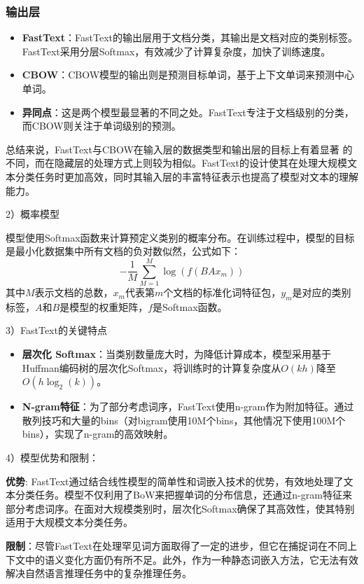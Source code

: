 \subsubsection*{输出层}
\begin{itemize}
    \item \textbf{FastText}：FastText的输出层用于文档分类，其输出是文档对应的类别标签。FastText采用分层Softmax，有效减少了计算复杂度，加快了训练速度。
    \item \textbf{CBOW}：CBOW模型的输出则是预测目标单词，基于上下文单词来预测中心单词。
    \item \textbf{异同点}：这是两个模型最显著的不同之处。FastText专注于文档级别的分类，而CBOW则关注于单词级别的预测。
\end{itemize}

总结来说，FastText与CBOW在输入层的数据类型和输出层的目标上有着显著
的不同，而在隐藏层的处理方式上则较为相似。FastText的设计使其在处理大规模文
本分类任务时更加高效，同时其输入层的丰富特征表示也提高了模型对文本的理解能力。


2）概率模型

模型使用Softmax函数来计算预定义类别的概率分布。在训练过程中，模型的目标是最小化数据集中所有文档的负对数似然，公式如下：
\begin{equation}
  - \frac{1}{M} \sum_{M=1}^{M} \log(f(BAx_m))
\end{equation}
其中$M$表示文档的总数，$x_m$代表第$m$个文档的标准化词特征包，$y_m$是对应的类别标签，$A$和$B$是模型的权重矩阵，$f$是Softmax函数。

3）FastText的关键特点

\begin{itemize}
  \item \textbf{层次化 Softmax}：当类别数量庞大时，为降低计算成本，模型采用基于Huffman编码树的层次化Softmax，将训练时的计算复杂度从$O(kh)$降至$O(h \log_2(k))$。
  \item \textbf{N-gram特征}：为了部分考虑词序，FastText使用n-gram作为附加特征。通过散列技巧和大量的bins（对bigram使用10M个bins，其他情况下使用100M个bins），实现了n-gram的高效映射。
\end{itemize}

4）模型优势和限制：

\textbf{优势}: FastText通过结合线性模型的简单性和词嵌入技术的优势，有效地处理了文本分类任务。模型不仅利用了BoW来把握单词的分布信息，还通过n-gram特征来部分考虑词序。在面对大规模类别时，层次化Softmax确保了其高效性，使其特别适用于大规模文本分类任务。

\textbf{限制}：尽管FastText在处理罕见词方面取得了一定的进步，但它在捕捉词在不同上下文中的语义变化方面仍有所不足。此外，作为一种静态词嵌入方法，它无法有效解决自然语言推理任务中的复杂推理任务。


